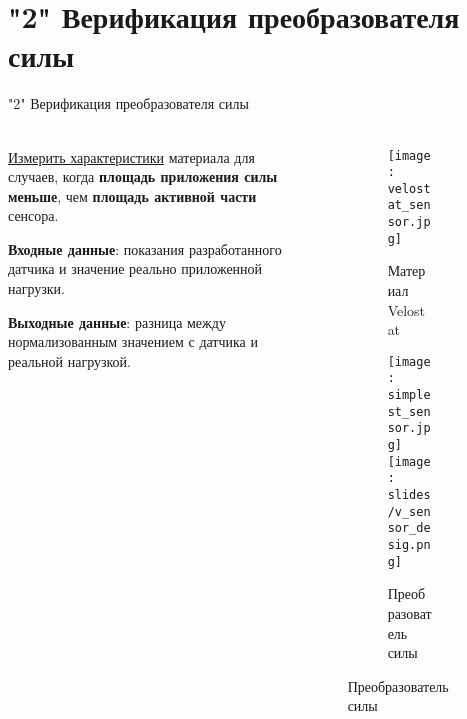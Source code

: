 \section{"2" Верификация преобразователя силы}

\begin{frame}[t]{"2" Верификация преобразователя силы}
    \framesubtitle{}
    \begin{columns}[T,onlytextwidth]
        \begin{column}{0.59\textwidth}
            \underline{Измерить характеристики} материала для случаев, когда \textbf{площадь приложения силы меньше}, чем \textbf{площадь активной части} сенсора.

            \textbf{Входные данные}: показания разработанного датчика и значение реально приложенной нагрузки.

            \textbf{Выходные данные}: разница между нормализованным значением с датчика и реальной нагрузкой.
        
            

        \end{column}
        \begin{column}{0.39\textwidth}
            \vspace{-0.6cm}
            \begin{figure}[H]
                \begin{subfigure}{0.9\textwidth}
                    \centering\texttt{[image: velostat\_sensor.jpg]}
                    \caption*{Материал Velostat}
                \end{subfigure}

                \begin{subfigure}{0.9\textwidth}
                    \centering\texttt{[image: simplest\_sensor.jpg]}
                    \centering\texttt{[image: slides/v\_sensor\_desig.png]}
                    \caption*{Преобразователь силы}
                \end{subfigure}
            \end{figure}
        \end{column}
    \end{columns}
\end{frame}

